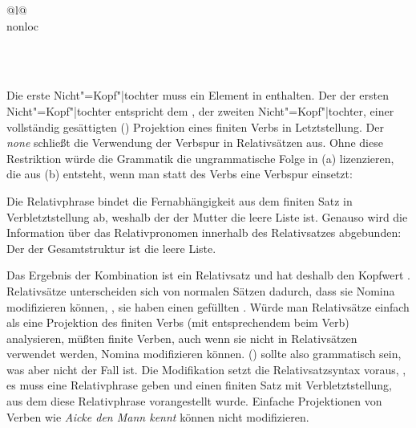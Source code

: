 \begin{samepage}
\begin{schema}
{{\begin{tabular}{@{}l@{}}
{{                                                                     } \\
                                                 nonloc  \\
                                               } \\
                            \end{tabular}
                         } \\
}%
\end{schema}
\end{samepage}
%
Die erste Nicht"=Kopf"|tochter muss ein Element in \rel enthalten. Der \localw der ersten
Nicht"=Kopf"|tochter  entspricht dem \slashw, der zweiten Nicht"=Kopf"|tochter, einer
vollständig gesättigten (\comps \eliste) Projektion eines finiten Verbs in Letztstellung. Der \dslw
\emph{none} schließt die Verwendung der Verbspur in Relativsätzen aus. Ohne diese Restriktion würde
die Grammatik die ungrammatische Folge in (a) lizenzieren, die aus (b) entsteht, wenn
man statt des Verbs eine Verbspur einsetzt:
\eal
{}
\zl

\noindent
Die Relativphrase bindet die Fernabhängigkeit aus dem finiten Satz in Verbletztstellung ab,
weshalb der \slashw der Mutter die leere Liste ist. Genauso wird die Information über das
Relativpronomen innerhalb des Relativsatzes abgebunden: Der \relw der Gesamtstruktur ist die leere Liste. 

Das Ergebnis der Kombination ist ein Relativsatz und hat deshalb den Kopfwert
.\label{Erklaerung-relativizer} Relativsätze unterscheiden sich von normalen Sätzen dadurch, dass sie Nomina
modifizieren können, \dash, sie haben einen gefüllten \modw. Würde man Relativsätze einfach als eine
Projektion des finiten Verbs (mit entsprechendem \modw beim Verb) analysieren, müßten finite Verben,
auch wenn sie nicht in Relativsätzen verwendet werden, Nomina modifizieren können. () sollte
also grammatisch sein, was aber nicht der Fall ist.
\z
Die Modifikation setzt die Relativsatzsyntax voraus, \dash, es muss eine Relativphrase geben und einen
finiten Satz mit Verbletztstellung, aus dem diese Relativphrase vorangestellt wurde. Einfache
Projektionen von Verben wie \emph{Aicke den Mann kennt} können nicht modifizieren.



